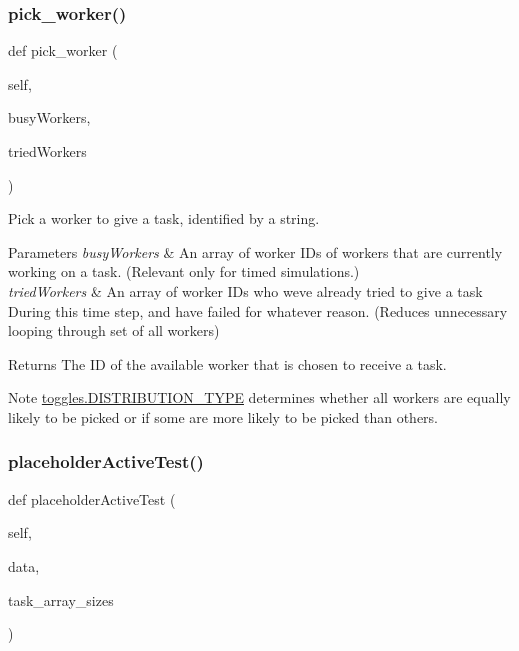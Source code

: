 \subsubsection{\texorpdfstring{pick\+\_\+worker()}{pick\_worker()}}
{\footnotesize\ttfamily def pick\+\_\+worker (\begin{DoxyParamCaption}\item[{}]{self,  }\item[{}]{busy\+Workers,  }\item[{}]{tried\+Workers }\end{DoxyParamCaption})}



Pick a worker to give a task, identified by a string. 


\begin{DoxyParams}{Parameters}
{\em busy\+Workers} & An array of worker I\+Ds of workers that are currently working on a task. (Relevant only for timed simulations.) \\
\hline
{\em tried\+Workers} & An array of worker I\+Ds who we\textquotesingle{}ve already tried to give a task During this time step, and have failed for whatever reason. (Reduces unnecessary looping through set of all workers) \\
\hline
\end{DoxyParams}
\begin{DoxyReturn}{Returns}
The ID of the available worker that is chosen to receive a task. 
\end{DoxyReturn}
\begin{DoxyNote}{Note}
\mbox{\hyperlink{namespacedynamicfilterapp_1_1toggles_aceed21fa0675802d2f756c7da43cb049}{toggles.\+D\+I\+S\+T\+R\+I\+B\+U\+T\+I\+O\+N\+\_\+\+T\+Y\+PE}} determines whether all workers are equally likely to be picked or if some are more likely to be picked than others. 
\end{DoxyNote}
\mbox{\label{classdynamicfilterapp_1_1test__simulations_1_1_simulation_test_ac0c6db97fdb6cea1796780b48515cb30}} 
\subsubsection{\texorpdfstring{placeholder\+Active\+Test()}{placeholderActiveTest()}}
{\footnotesize\ttfamily def placeholder\+Active\+Test (\begin{DoxyParamCaption}\item[{}]{self,  }\item[{}]{data,  }\item[{}]{task\+\_\+array\+\_\+sizes }\end{DoxyParamCaption})}



